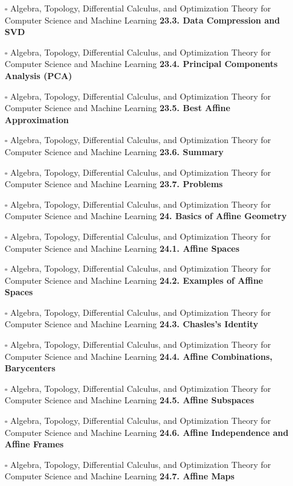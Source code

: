 \documentclass[a4, landscape, 12pt]{article}
\newcommand{\checkbox}{$\square$}%
\begin{document}
\begin{itemize}
{}
\item [\checkbox]  Algebra, Topology, Differential Calculus, and Optimization Theory for Computer Science and Machine Learning \textbf{ 23.3. Data Compression and SVD
}
\item [\checkbox]  Algebra, Topology, Differential Calculus, and Optimization Theory for Computer Science and Machine Learning \textbf{ 23.4. Principal Components Analysis (PCA)
}
\item [\checkbox]  Algebra, Topology, Differential Calculus, and Optimization Theory for Computer Science and Machine Learning \textbf{ 23.5. Best Affine Approximation
}
\item [\checkbox]  Algebra, Topology, Differential Calculus, and Optimization Theory for Computer Science and Machine Learning \textbf{ 23.6. Summary
}
\item [\checkbox]  Algebra, Topology, Differential Calculus, and Optimization Theory for Computer Science and Machine Learning \textbf{ 23.7. Problems
}
\item [\checkbox]  Algebra, Topology, Differential Calculus, and Optimization Theory for Computer Science and Machine Learning \textbf{ 24. Basics of Affine Geometry
}
\item [\checkbox]  Algebra, Topology, Differential Calculus, and Optimization Theory for Computer Science and Machine Learning \textbf{ 24.1. Affine Spaces
}
\item [\checkbox]  Algebra, Topology, Differential Calculus, and Optimization Theory for Computer Science and Machine Learning \textbf{ 24.2. Examples of Affine Spaces
}
\item [\checkbox]  Algebra, Topology, Differential Calculus, and Optimization Theory for Computer Science and Machine Learning \textbf{ 24.3. Chasles’s Identity
}
\item [\checkbox]  Algebra, Topology, Differential Calculus, and Optimization Theory for Computer Science and Machine Learning \textbf{ 24.4. Affine Combinations, Barycenters
}
\item [\checkbox]  Algebra, Topology, Differential Calculus, and Optimization Theory for Computer Science and Machine Learning \textbf{ 24.5. Affine Subspaces
}
\item [\checkbox]  Algebra, Topology, Differential Calculus, and Optimization Theory for Computer Science and Machine Learning \textbf{ 24.6. Affine Independence and Affine Frames
}
\item [\checkbox]  Algebra, Topology, Differential Calculus, and Optimization Theory for Computer Science and Machine Learning \textbf{ 24.7. Affine Maps
}
\end{itemize}
\end{document}
